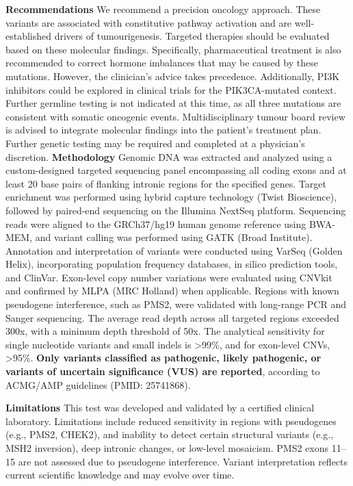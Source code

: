 \documentclass[11pt]{extarticle}
\begin{document}
{\Large \bf Recommendations \newline}
We recommend a precision oncology approach. These variants are associated with constitutive pathway activation and are well-established drivers of tumourigenesis. Targeted therapies should be evaluated based on these molecular findings. Specifically, pharmaceutical treatment is also recommended to correct hormone imbalances that may be caused by these mutations. However, the clinician's advice takes precedence. Additionally, PI3K inhibitors could be explored in clinical trials for the PIK3CA-mutated context. Further germline testing is not indicated at this time, as all three mutations are consistent with somatic oncogenic events. Multidisciplinary tumour board review is advised to integrate molecular findings into the patient's treatment plan. Further genetic testing may be required and completed at a physician's discretion. 
\newline 
\newline
{\Large \bf Methodology} \newline
Genomic DNA was extracted and analyzed using a custom-designed targeted sequencing panel encompassing all coding exons and at least 20 base pairs of flanking intronic regions for the specified genes. Target enrichment was performed using hybrid capture technology (Twist Bioscience), followed by paired-end sequencing on the Illumina NextSeq platform. Sequencing reads were aligned to the GRCh37/hg19 human genome reference using BWA-MEM, and variant calling was performed using GATK (Broad Institute). Annotation and interpretation of variants were conducted using VarSeq (Golden Helix), incorporating population frequency databases, in silico prediction tools, and ClinVar. Exon-level copy number variations were evaluated using CNVkit and confirmed by MLPA (MRC Holland) when applicable. Regions with known pseudogene interference, such as PMS2, were validated with long-range PCR and Sanger sequencing. The average read depth across all targeted regions exceeded 300x, with a minimum depth threshold of 50x. The analytical sensitivity for single nucleotide variants and small indels is >99\%, and for exon-level CNVs, >95\%. {\bf Only variants classified as pathogenic, likely pathogenic, or variants of uncertain significance (VUS) are reported}, according to ACMG/AMP guidelines (PMID: 25741868).


{\large \bf Limitations \newline}
This test was developed and validated by a certified clinical laboratory. Limitations include reduced sensitivity in regions with pseudogenes (e.g., PMS2, CHEK2), and inability to detect certain structural variants (e.g., MSH2 inversion), deep intronic changes, or low-level mosaicism. PMS2 exons 11–15 are not assessed due to pseudogene interference. Variant interpretation reflects current scientific knowledge and may evolve over time.
\end{document}
